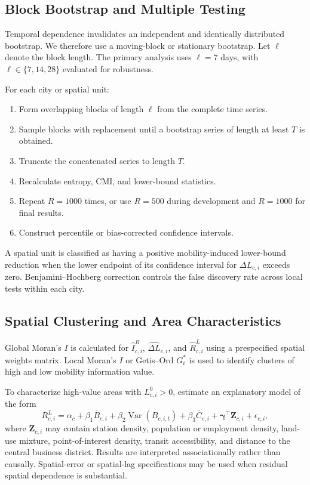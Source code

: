 \documentclass[applsci,article,submit,moreauthors]{Definitions/mdpi}
\begin{document}
\subsection{Block Bootstrap and Multiple Testing}
\label{subsec:bootstrap}

Temporal dependence invalidates an independent and identically distributed bootstrap. We therefore use a moving-block or stationary bootstrap. Let $\ell$ denote the block length. The primary analysis uses $\ell=7$ days, with $\ell\in\{7,14,28\}$ evaluated for robustness.

For each city or spatial unit:
\begin{enumerate}
    \item Form overlapping blocks of length $\ell$ from the complete time series.
    \item Sample blocks with replacement until a bootstrap series of length at least $T$ is obtained.
    \item Truncate the concatenated series to length $T$.
    \item Recalculate entropy, CMI, and lower-bound statistics.
    \item Repeat $R=1000$ times, or use $R=500$ during development and $R=1000$ for final results.
    \item Construct percentile or bias-corrected confidence intervals.
\end{enumerate}

A spatial unit is classified as having a positive mobility-induced lower-bound reduction when the lower endpoint of its confidence interval for $\Delta L_{c,i}$ exceeds zero. Benjamini--Hochberg correction controls the false discovery rate across local tests within each city.

\subsection{Spatial Clustering and Area Characteristics}
\label{subsec:spatial_explanation}

Global Moran's $I$ is calculated for $\widehat{I}^{B}_{c,i}$, $\widehat{\Delta L}_{c,i}$, and $\widehat{R}^{L}_{c,i}$ using a prespecified spatial weights matrix. Local Moran's $I$ or Getis--Ord $G_i^{*}$ is used to identify clusters of high and low mobility information value.

To characterize high-value areas with \(L^{0}_{c,i}>0\), estimate an explanatory model of the form
\begin{equation}
R^{L}_{c,i}
=
\alpha_c
+
\beta_1\overline{B}_{c,i}
+
\beta_2\operatorname{Var}(B_{c,i,t})
+
\beta_3\overline{C}_{c,i}
+
\boldsymbol{\gamma}^{\top}\mathbf{Z}_{c,i}
+
\epsilon_{c,i},
\label{eq:area_characteristics_model}
\end{equation}
where $\mathbf{Z}_{c,i}$ may contain station density, population or employment density, land-use mixture, point-of-interest density, transit accessibility, and distance to the central business district. Results are interpreted associationally rather than causally. Spatial-error or spatial-lag specifications may be used when residual spatial dependence is substantial.
\end{document}
